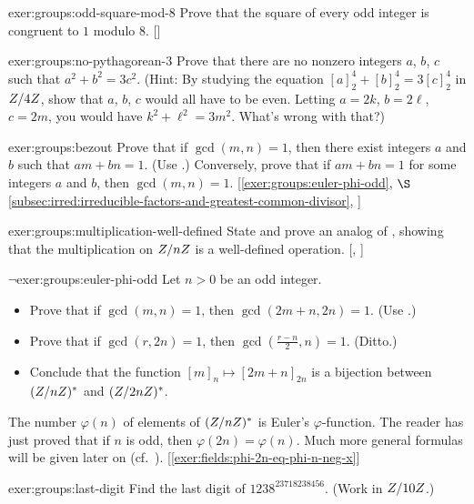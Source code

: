 \begin{exer}{\exerused}{exer:groups:odd-square-mod-8}
  Prove that the square of every odd integer is congruent to $1$
  modulo $8$.  []
\end{exer}

\begin{exer}{}{exer:groups:no-pythagorean-3}
  Prove that there are no nonzero integers $a$, $b$, $c$ such that
  $a^2 + b^2 = 3c^2$. (Hint: By studying the equation
  $[a]_2^4 + [b]_2^4 = 3[c]_2^4$ in $Z/4Z$, show that $a$, $b$, $c$
  would all have to be even.  Letting $a = 2k$, $b = 2\ell$, $c = 2m$,
  you would have $k^2 + \ell^2 = 3m^2$.  What's wrong with that?)
\end{exer}

\begin{exer}{\exerused}{exer:groups:bezout}
  Prove that if $\gcd(m,n) = 1$, then there exist integers $a$ and $b$
  such that $am + bn = 1$. (Use .)
  Conversely, prove that if $am + bn = 1$ for some integers $a$ and
  $b$, then $\gcd(m,n) = 1$. [\ref{exer:groups:euler-phi-odd},
  $\S$\ref{subsec:irred:irreducible-factors-and-greatest-common-divisor},
  ]
\end{exer}
\begin{exer}{\exerused}{exer:groups:multiplication-well-defined}
  State and prove an analog of ,
  showing that the multiplication on $Z/nZ$ is a well-defined
  operation. [,
  ]
\end{exer}

\begin{exer}{$\lnot$}{exer:groups:euler-phi-odd}
  Let $n > 0$ be an odd integer.
  \begin{itemize}
  \item Prove that if $\gcd(m,n) = 1$, then $\gcd(2m+n, 2n) = 1$. (Use
    .)
  \item Prove that if $\gcd(r,2n) = 1$, then
    $\gcd\!\left(\frac{r-n}{2}, n\right) = 1$. (Ditto.)
  \item Conclude that the function $[m]_n \mapsto [2m+n]_{2n}$ is a
    bijection between $(Z/nZ)^*$ and $(Z/2nZ)^*$.
  \end{itemize}
  The number $\varphi(n)$ of elements of $(Z/nZ)^*$ is Euler's
  $\varphi$-function. The reader has just proved that if $n$ is odd,
  then $\varphi(2n) = \varphi(n)$. Much more general formulas will be
  given later on (cf.\
  ). [\ref{exer:fields:phi-2n-eq-phi-n-neg-x}]
\end{exer}
\begin{exer}{}{exer:groups:last-digit}
  Find the last digit of $1238^{23718238456}$. (Work in $Z/10Z$.)
\end{exer}

